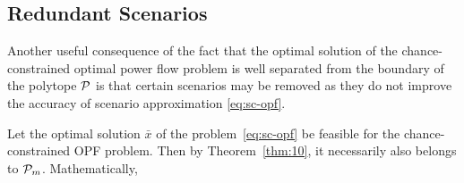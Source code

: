 \documentclass{IEEEtran4PSCC}
\newcommand{\cP}{{\cal P}}
\begin{document}





\subsection{Redundant Scenarios}\label{sec:obs}

Another useful consequence of the fact that the optimal solution of the chance-constrained optimal power flow problem is well separated from the boundary of the polytope $\cP$ is that certain scenarios may be removed as they do not improve the accuracy of scenario approximation \eqref{eq:sc-opf}.

Let the optimal solution $\bar x$ of the problem~\eqref{eq:sc-opf} be feasible for the chance-constrained OPF problem. Then by Theorem~\ref{thm:10}, it necessarily also belongs to $\cP_m$. Mathematically, 
\end{document}
